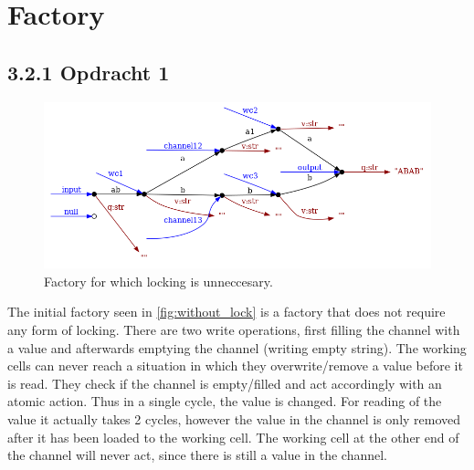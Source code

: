 \documentclass[a4paper,12px]{article}
\begin{document}
\newcommand{\Sum}[2]{\sum^{#2}_{#1}}
\newcommand{\E}[1]{{\mathbb{E}\left[#1\right]}}
\newcommand{\var}[1]{{\text{var}\left[#1\right]}}
\newcommand{\diffpart}[1]{\frac{\partial}{\partial{} #1}}
\newcommand{\?}{\stackrel{?}{=}}
\newcommand{\intinf}{\int\limits_{-\infty}^{\infty}}
\newcommand{\intnulinf}{\int\limits_{0}^{\infty}}
\newcommand{\intpi}{\int\limits_{0}^{2\pi}}
\newcommand{\argmin}[1]{\underset{#1}{\mathop{\mathrm{argmin}}}}
\newcommand{\argmax}[1]{\underset{#1}{\mathop{\mathrm{argmax}}}}


\section{Factory}

\subsection{3.2.1 Opdracht 1}

\begin{figure}[h]
    \centering
    \includegraphics[width=\linewidth]{without_lock.png}
    \caption{Factory for which locking is unneccesary.}
    \label{fig:without_lock}
\end{figure}
\FloatBarrier%

The initial factory seen in \autoref{fig:without_lock} is a factory that does
not require any form of locking. There are two write operations, first
filling the channel with a value and afterwards emptying the channel (writing
empty string). The working cells can never reach a situation in which they
overwrite/remove a value before it is read. They check if the channel is
empty/filled and act accordingly with an atomic action. Thus in a single cycle,
the value is changed. For reading of the value it actually takes 2 cycles,
however the value in the channel is only removed after it has been loaded to
the working cell. The working cell at the other end of the channel will never
act, since there is still a value in the channel.
\end{document}
